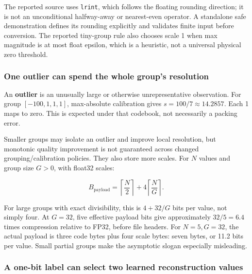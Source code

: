 The reported source uses \texttt{lrint}, which follows the floating rounding direction; it is not an unconditional halfway-away or nearest-even operator. A standalone safe demonstration defines its rounding explicitly and validates finite input before conversion. The reported tiny-group rule also chooses scale 1 when max magnitude is at most float epsilon, which is a heuristic, not a universal physical zero threshold.

\subsubsection{One outlier can spend the whole group's resolution}\label{01-foundations-i-ch001-one-outlier-can-spend-the-whole-groups-resolution}

\hypertarget{01-foundations-i-ch001-one-outlier-can-spend-the-whole-groups-resolution}{}

An \textbf{outlier} is an unusually large or otherwise unrepresentative observation. For group \([-100,1,1,1]\), max-absolute calibration gives \(s=100/7\approx14.2857\). Each 1 maps to zero. This is expected under that codebook, not necessarily a packing error.

Smaller groups may isolate an outlier and improve local resolution, but monotonic quality improvement is not guaranteed across changed grouping/calibration policies. They also store more scales. For \(N\) values and group size \(G>0\), with float32 scales:

\[
B_{\mathrm{payload}}=
\left\lceil\frac N2\right\rceil
+4\left\lceil\frac NG\right\rceil.
\]

For large groups with exact divisibility, this is \(4+32/G\) bits per value, not simply four. At \(G=32\), five effective payload bits give approximately \(32/5=6.4\) times compression relative to FP32, before file headers. For \(N=5,G=32\), the actual payload is three code bytes plus four scale bytes: seven bytes, or 11.2 bits per value. Small partial groups make the asymptotic slogan especially misleading.

\subsubsection{A one-bit label can select two learned reconstruction values}\label{01-foundations-i-ch001-a-one-bit-label-can-select-two-learned-reconstruction-values}

\hypertarget{01-foundations-i-ch001-a-one-bit-label-can-select-two-learned-reconstruction-values}{}

